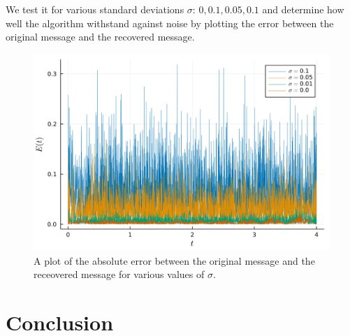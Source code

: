 \documentclass[12pt]{article}
\begin{document}
    We test it for various standard deviations $\sigma$: $0, 0.1, 0.05, 0.1$ and determine how well the algorithm withstand against noise by plotting the error between the original message and the recovered message. 
    \begin{figure}[H]
        \includegraphics[width=\linewidth]{error_plot_noise.png}
        \centering
        \caption{A plot of the absolute error between the original message and the receovered message for various values of $\sigma$.}
    \end{figure}

    \section{Conclusion}
  \newpage    
    \printbibliography
\end{document}
